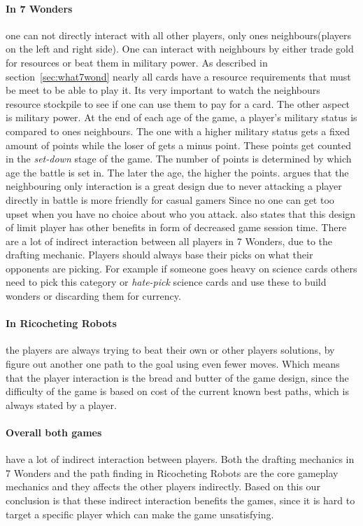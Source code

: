 \documentclass[a4paper]{article}
\begin{document}
\paragraph{In 7 Wonders} one can not directly interact with all other players, only ones neighbours(players on the left and right side).
One can interact with neighbours by either trade gold for resources or beat them in military power.
As described in section~\ref{sec:what7wond} nearly all cards have a resource requirements that must be meet to be able to play it.
Its very important to watch the neighbours resource stockpile to see if one can use them to pay for a card.
The other aspect is military power.
At the end of each age of the game, a player's military status is compared to ones neighbours.
The one with a higher military status gets a fixed amount of points while the loser of gets a minus point.
These points get counted in the \textit{set-down} stage of the game. The number of points is determined by which age the battle is set in.
The later the age, the higher the points. 
 argues that the neighbouring only interaction is a great design due to never attacking a player directly in battle is more friendly for casual gamers Since no one can get too upset when you have no choice about who you attack. \citeauthor{notsacgame7wond} also states that this design of limit player has other benefits in form of decreased game session time.
There are a lot of indirect interaction between all players in 7 Wonders, due to the drafting mechanic. Players should always base their picks on what their opponents are picking.
For example if someone goes heavy on science cards others need to pick this category or \textit{hate-pick} science cards and use these to build wonders or discarding them for currency.

\paragraph{In Ricocheting Robots} the players are always trying to beat their own or other players solutions, by figure out another one path to the goal using even fewer moves. Which means that the player interaction is the bread and butter of the game design, since the difficulty of the game is based on cost of the current known best paths, which is always stated by a player. 

\paragraph{Overall both games} have a lot of indirect interaction between players. Both the drafting mechanics in 7 Wonders and the path finding in Ricocheting Robots are the core gameplay mechanics and they affects the other players indirectly. Based on this our conclusion is that these indirect interaction benefits the games, since it is hard to target a specific player which can make the game unsatisfying.
\end{document}
